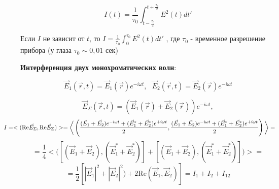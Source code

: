 \documentclass[12pt, a4paper]{report}
\begin{document}
\[ I(t ) = \frac{1}{\tau_0 } \int_{t - \frac{\tau_0}{2 } }^{t + \frac{\tau_0 }{2 } } E ^2 (t ) d t '    \] 

Если \( I  \)  не зависит от \( t  \), то \(\displaystyle  I = \frac{1}{\tau_0 } \int_{0 }^{\tau_0 } E ^2 (t ) dt '    \)  
, где \( \tau_0  \) - временное разрешение прибора (у глаза \( \tau_0   \sim 0,01 \text{ сек} \))

\textbf{Интерференция двух монохроматических волн}: 

\[ \vec{E }_1 (\vec{r },t    ) = \vec{E }  _1 (\vec{r } ) e^{ - i \omega t } , \text{ } \vec{E } _2 (\vec{r }  ,t ) = \vec{E }  _2 (\vec{r }  ) e ^{ - i \omega t }   \] 

\[ \vec{E } _{\Sigma } (\vec{r } ,t ) = (\vec{E }  _1 (\vec{r } ) + \vec{E }  _2 (\vec{r } )) e^{ - i \omega t } ,  \] 
\[ \kern-1 cm I = <(\mathrm{Re }  \vec{E } _{\Sigma } , \mathrm{Re } \vec{E } _{\Sigma}    )>  = \bigg<\left( \frac{(\vec{E } _1 + \vec{E }  _2 )e^{ -i \omega t } + (\vec{E } _1 ^ * + \vec{E }  _2 ^ * ) e^{ + i \omega t }  }{2} ,\frac{(\vec{E } _1 + \vec{E }  _2 )e^{ -i \omega t } + (\vec{E } _1 ^ * + \vec{E }  _2 ^ * ) e^{ + i \omega t }  }{2} \right) \bigg> =\] 
\[ = \frac{1}{4 }  \bigg < \bigg ( [(\vec{E } _1 + \vec{E }  _2  ) , (\vec{E } _1 ^ * + \vec{E } _2 ^ *)] + [(\vec{E } _1 + \vec{E }  _2  ), (\vec{E } _1 ^ * + \vec{E } _2 ^ *)] \bigg) \bigg > =\]  
\[= \frac{1}{2 }  \left[  |  \vec{E } _1       | ^2 + |  \vec{E } _2  | ^2 ) + 2 \mathrm{Re }  (\vec{E } _1 , \vec{E }  _2 ) \right] = I_1 + I_2 + I_{12} \] 

\ifdefined\mainfile
\else
    
\end{document}
